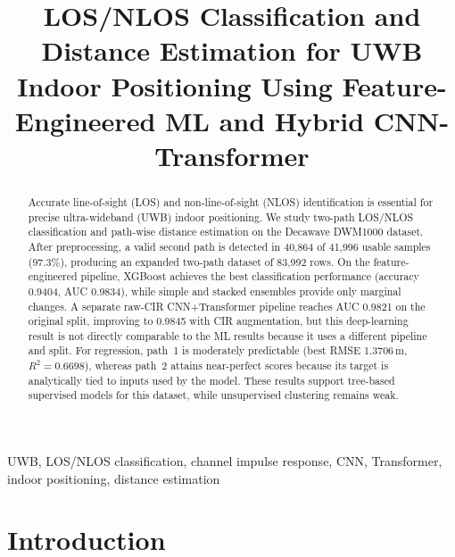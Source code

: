 \documentclass[conference]{IEEEtran}
\begin{document}
\title{LOS/NLOS Classification and Distance Estimation for UWB Indoor Positioning Using Feature-Engineered ML and Hybrid CNN-Transformer}

\author{
}

\maketitle

\begin{abstract}
Accurate line-of-sight (LOS) and non-line-of-sight (NLOS) identification is essential for precise ultra-wideband (UWB) indoor positioning. We study two-path LOS/NLOS classification and path-wise distance estimation on the Decawave DWM1000 dataset. After preprocessing, a valid second path is detected in 40,864 of 41,996 usable samples (97.3\%), producing an expanded two-path dataset of 83,992 rows. On the feature-engineered pipeline, XGBoost achieves the best classification performance (accuracy 0.9404, AUC 0.9834), while simple and stacked ensembles provide only marginal changes. A separate raw-CIR CNN+Transformer pipeline reaches AUC 0.9821 on the original split, improving to 0.9845 with CIR augmentation, but this deep-learning result is not directly comparable to the ML results because it uses a different pipeline and split. For regression, path~1 is moderately predictable (best RMSE 1.3706\,m, $R^2=0.6698$), whereas path~2 attains near-perfect scores because its target is analytically tied to inputs used by the model. These results support tree-based supervised models for this dataset, while unsupervised clustering remains weak.
\end{abstract}

\begin{IEEEkeywords}
UWB, LOS/NLOS classification, channel impulse response, CNN, Transformer, indoor positioning, distance estimation
\end{IEEEkeywords}

\section{Introduction}
\end{document}
